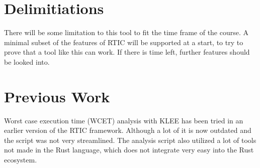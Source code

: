 \section{Delimitiations}
There will be some limitation to this tool to fit the time frame of the course.
A minimal subset of the features of RTIC will be supported at a start, to try
to prove that a tool like this can work. If there is time left, further
features should be looked into. 

\section{Previous Work}
Worst case execution time (WCET) analysis with KLEE has been tried in an earlier
version of the RTIC framework\cite{lindner}. Although a lot of it is now
outdated and the script was not very streamlined. The analysis script also 
utilized a lot of tools not made in the Rust language, which does not integrate
very easy into the Rust ecosystem.

